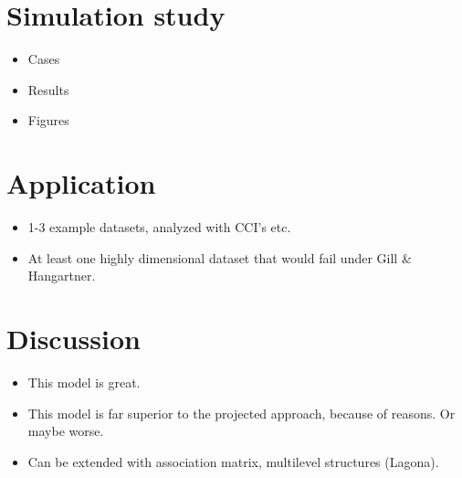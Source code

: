 \documentclass[12pt,a4paper]{article}
\begin{document}
\section{Simulation study}

\begin{itemize}
\item Cases
\item Results
\item Figures
\end{itemize}

\section{Application}

\begin{itemize}
\item 1-3 example datasets, analyzed with CCI's etc. 
\item At least one highly dimensional dataset that would fail under Gill \& Hangartner.  
\end{itemize}


\section{Discussion}

\begin{itemize}
\item This model is great.
\item This model is far superior to the projected approach, because of reasons. Or maybe worse. 
\item Can be extended with association matrix, multilevel structures (Lagona).
\end{itemize}
\end{document}
